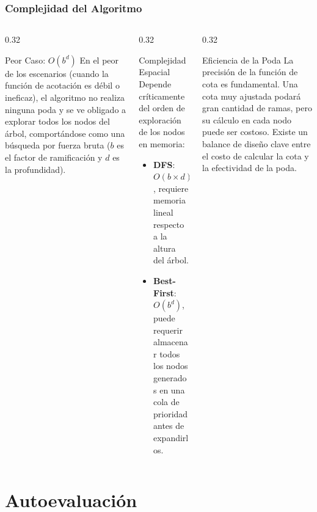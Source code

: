 \documentclass[aspectratio=169]{beamer}
\begin{document}
\begin{frame}[fragile]
    \frametitle{Complejidad del Algoritmo}
    \justifying
    
    \begin{columns}[t]
        \begin{column}{0.32\textwidth}
            \begin{alertblock}{Peor Caso: $O(b^d)$}
                \scriptsize
                En el peor de los escenarios (cuando la función de acotación es débil o ineficaz), el algoritmo no realiza ninguna poda y se ve obligado a explorar todos los nodos del árbol, comportándose como una búsqueda por fuerza bruta ($b$ es el factor de ramificación y $d$ es la profundidad).
            \end{alertblock}
        \end{column}
        \hfill
        \begin{column}{0.32\textwidth}
            \begin{block}{Complejidad Espacial}
                \scriptsize
                Depende críticamente del orden de exploración de los nodos en memoria:
                \begin{itemize}
                    \item \textbf{DFS}: $O(b \times d)$, requiere memoria lineal respecto a la altura del árbol.
                    \item \textbf{Best-First}: $O(b^d)$, puede requerir almacenar todos los nodos generados en una cola de prioridad antes de expandirlos.
                \end{itemize}
            \end{block}
        \end{column}
        \hfill
        \begin{column}{0.32\textwidth}
            \begin{exampleblock}{Eficiencia de la Poda}
                \scriptsize
                La precisión de la función de cota es fundamental. Una cota muy ajustada podará gran cantidad de ramas, pero su cálculo en cada nodo puede ser costoso. Existe un balance de diseño clave entre el costo de calcular la cota y la efectividad de la poda.
            \end{exampleblock}
        \end{column}
    \end{columns}
\end{frame}

\section{Autoevaluación}
\end{document}
